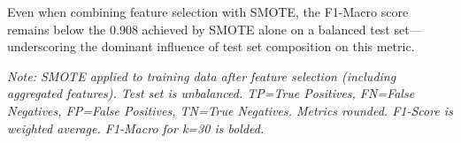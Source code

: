 \documentclass[12pt]{article}
\begin{document}
\begin{highlightbox}
Even when combining feature selection with SMOTE, the F1-Macro score remains below the 0.908 achieved by SMOTE alone on a
balanced test set---underscoring the dominant influence of test set composition on this metric.
\end{highlightbox}


\begin{table}[htb]
  \centering
  \caption{EFC Performance: SMOTE with Feature Selection for Varying k (Experiment 3a).}
  \label{tab:exp3_smote_fs_results}
  \par\medskip
  \footnotesize
  \textit{Note: SMOTE applied to training data after feature selection (including aggregated features). Test set is unbalanced.
  TP=True Positives, FN=False Negatives, FP=False Positives, TN=True Negatives. Metrics rounded. F1-Score is weighted average.
  F1-Macro for k=30 is bolded.}
\end{table}
\end{document}
